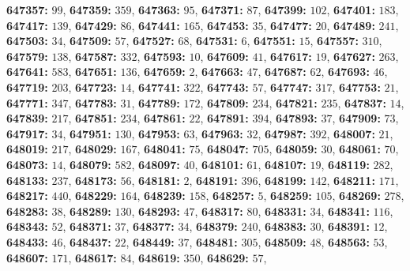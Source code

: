 \textsf{\bfseries 647357:} $99$, \textsf{\bfseries 647359:} $359$, \textsf{\bfseries 647363:} $95$, \textsf{\bfseries 647371:} $87$, \textsf{\bfseries 647399:} $102$, \textsf{\bfseries 647401:} $183$, \textsf{\bfseries 647417:} $139$, \textsf{\bfseries 647429:} $86$, \textsf{\bfseries 647441:} $165$, \textsf{\bfseries 647453:} $35$, \textsf{\bfseries 647477:} $20$, \textsf{\bfseries 647489:} $241$, \textsf{\bfseries 647503:} $34$, \textsf{\bfseries 647509:} $57$, \textsf{\bfseries 647527:} $68$, \textsf{\bfseries 647531:} $6$, \textsf{\bfseries 647551:} $15$, \textsf{\bfseries 647557:} $310$, \textsf{\bfseries 647579:} $138$, \textsf{\bfseries 647587:} $332$, \textsf{\bfseries 647593:} $10$, \textsf{\bfseries 647609:} $41$, \textsf{\bfseries 647617:} $19$, \textsf{\bfseries 647627:} $263$, \textsf{\bfseries 647641:} $583$, \textsf{\bfseries 647651:} $136$, \textsf{\bfseries 647659:} $2$, \textsf{\bfseries 647663:} $47$, \textsf{\bfseries 647687:} $62$, \textsf{\bfseries 647693:} $46$, \textsf{\bfseries 647719:} $203$, \textsf{\bfseries 647723:} $14$, \textsf{\bfseries 647741:} $322$, \textsf{\bfseries 647743:} $57$, \textsf{\bfseries 647747:} $317$, \textsf{\bfseries 647753:} $21$, \textsf{\bfseries 647771:} $347$, \textsf{\bfseries 647783:} $31$, \textsf{\bfseries 647789:} $172$, \textsf{\bfseries 647809:} $234$, \textsf{\bfseries 647821:} $235$, \textsf{\bfseries 647837:} $14$, \textsf{\bfseries 647839:} $217$, \textsf{\bfseries 647851:} $234$, \textsf{\bfseries 647861:} $22$, \textsf{\bfseries 647891:} $394$, \textsf{\bfseries 647893:} $37$, \textsf{\bfseries 647909:} $73$, \textsf{\bfseries 647917:} $34$, \textsf{\bfseries 647951:} $130$, \textsf{\bfseries 647953:} $63$, \textsf{\bfseries 647963:} $32$, \textsf{\bfseries 647987:} $392$, \textsf{\bfseries 648007:} $21$, \textsf{\bfseries 648019:} $217$, \textsf{\bfseries 648029:} $167$, \textsf{\bfseries 648041:} $75$, \textsf{\bfseries 648047:} $705$, \textsf{\bfseries 648059:} $30$, \textsf{\bfseries 648061:} $70$, \textsf{\bfseries 648073:} $14$, \textsf{\bfseries 648079:} $582$, \textsf{\bfseries 648097:} $40$, \textsf{\bfseries 648101:} $61$, \textsf{\bfseries 648107:} $19$, \textsf{\bfseries 648119:} $282$, \textsf{\bfseries 648133:} $237$, \textsf{\bfseries 648173:} $56$, \textsf{\bfseries 648181:} $2$, \textsf{\bfseries 648191:} $396$, \textsf{\bfseries 648199:} $142$, \textsf{\bfseries 648211:} $171$, \textsf{\bfseries 648217:} $440$, \textsf{\bfseries 648229:} $164$, \textsf{\bfseries 648239:} $158$, \textsf{\bfseries 648257:} $5$, \textsf{\bfseries 648259:} $105$, \textsf{\bfseries 648269:} $278$, \textsf{\bfseries 648283:} $38$, \textsf{\bfseries 648289:} $130$, \textsf{\bfseries 648293:} $47$, \textsf{\bfseries 648317:} $80$, \textsf{\bfseries 648331:} $34$, \textsf{\bfseries 648341:} $116$, \textsf{\bfseries 648343:} $52$, \textsf{\bfseries 648371:} $37$, \textsf{\bfseries 648377:} $34$, \textsf{\bfseries 648379:} $240$, \textsf{\bfseries 648383:} $30$, \textsf{\bfseries 648391:} $12$, \textsf{\bfseries 648433:} $46$, \textsf{\bfseries 648437:} $22$, \textsf{\bfseries 648449:} $37$, \textsf{\bfseries 648481:} $305$, \textsf{\bfseries 648509:} $48$, \textsf{\bfseries 648563:} $53$, \textsf{\bfseries 648607:} $171$, \textsf{\bfseries 648617:} $84$, \textsf{\bfseries 648619:} $350$, \textsf{\bfseries 648629:} $57$, 
